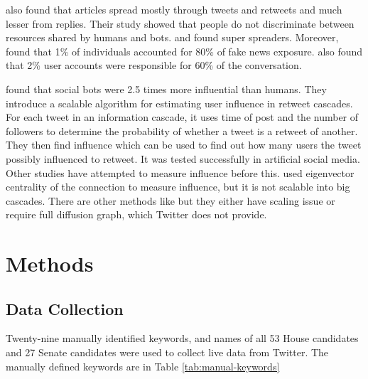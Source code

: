 \documentclass[letterpaper]{article}
\begin{document}
\cite{shao2018spread} also found that articles spread 
mostly through tweets and retweets and much lesser from replies. Their study showed that people do not discriminate between resources shared by humans and bots. 
\cite{shao2018spread} and \cite{grinberg2019fake} found super spreaders. Moreover,  \cite{grinberg2019fake} found that  1\% of individuals accounted for 80\% of fake news exposure. 
\cite{varol2017early} also found that 2\% user accounts were responsible for 60\% of the conversation. \par

\cite{rizoiu2018debatenight} found that social bots were 2.5 times more influential than humans. They introduce a scalable algorithm for estimating user influence in retweet cascades. 
For each tweet in an information cascade, it uses time of post and the number of followers to determine the probability of whether a tweet is a retweet of another. They then find influence which can be used 
to find out how many users the tweet possibly influenced to retweet. It was tested successfully in artificial social media. Other studies have attempted to measure influence before this. 
\cite{weng2010twitterrank} used eigenvector centrality of the connection to measure influence, but it is not scalable into big cascades. There are other methods like 
\cite{rodriguez2011uncovering,cho2013latent,linderman2014discovering} but they either have scaling issue or require full diffusion graph, which Twitter does not provide.

\section{Methods}
\label{sec:method}
\subsection{Data Collection}
Twenty-nine manually identified keywords, and names of all 53 House candidates and 27 Senate candidates were used to collect live data from Twitter. The manually defined keywords are in 
Table \ref{tab:manual-keywords}
\end{document}
